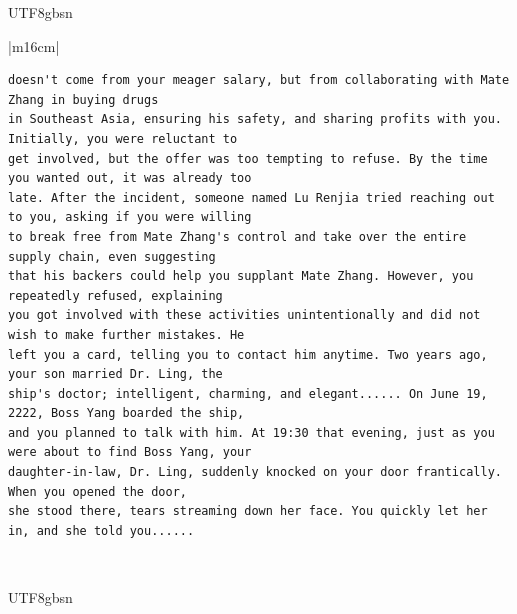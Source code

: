 \documentclass[11pt]{article}
\begin{document}
{\begin{CJK}{UTF8}{gbsn}
\begin{table}[ht!]
\begin{tabular}{|m{16cm}|}
\begin{minipage}[t]{\linewidth}
\begin{verbatim}
doesn't come from your meager salary, but from collaborating with Mate Zhang in buying drugs 
in Southeast Asia, ensuring his safety, and sharing profits with you. Initially, you were reluctant to
get involved, but the offer was too tempting to refuse. By the time you wanted out, it was already too 
late. After the incident, someone named Lu Renjia tried reaching out to you, asking if you were willing
to break free from Mate Zhang's control and take over the entire supply chain, even suggesting
that his backers could help you supplant Mate Zhang. However, you repeatedly refused, explaining
you got involved with these activities unintentionally and did not wish to make further mistakes. He 
left you a card, telling you to contact him anytime. Two years ago, your son married Dr. Ling, the
ship's doctor; intelligent, charming, and elegant...... On June 19, 2222, Boss Yang boarded the ship, 
and you planned to talk with him. At 19:30 that evening, just as you were about to find Boss Yang, your
daughter-in-law, Dr. Ling, suddenly knocked on your door frantically. When you opened the door,
she stood there, tears streaming down her face. You quickly let her in, and she told you......

\end{verbatim}
\end{minipage} \\
\end{tabular}
\end{table}
\end{CJK}

\begin{CJK}{UTF8}{gbsn}
\begin{table}[ht!]
\centering
\begin{minipage}[t]{\linewidth}
\begin{tabular}{|m{16cm}|}


\end{tabular}
\end{minipage}
\end{table}
\end{CJK}}
\end{document}
